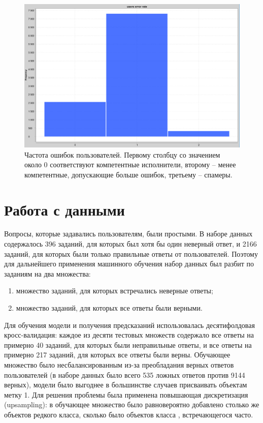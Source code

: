 \documentclass[specification,annotation,times]{itmo-student-thesis}
\begin{document}
\begin{figure}
  \includegraphics[scale=0.5]{users_error_rate.PNG}
  \caption{Частота ошибок пользователей. Первому столбцу со значением около 0 соответствуют компетентные исполнители, второму -- менее компетентные, допускающие больше ошибок, третьему -- спамеры.}
  \label{fig:users_error_rate}
\end{figure}

\section{Работа с данными}
Вопросы, которые задавались пользователям, были простыми. В наборе данных содержалось 396 заданий, для которых был хотя бы один неверный ответ, и 2166 заданий, для которых были только правильные ответы от пользователей. Поэтому для дальнейшего применения машинного обучения набор данных был разбит по заданиям на два множества: 
\begin{enumerate}
    \item множество заданий, для которых встречались неверные ответы;
    \item множество заданий, для которых все ответы были верными.
\end{enumerate}

Для обучения модели и получения предсказаний использовалась десятифолдовая кросс-валидация: каждое из десяти тестовых множеств содержало все ответы на примерно 40 заданий, для которых были неправильные ответы, и все ответы на примерно 217 заданий, для которых все ответы были верны. Обучающее множество было несбалансированным из-за преобладания верных ответов пользователей (в наборе данных было всего 535 ложных ответов против 9144 верных), модели было выгоднее в большинстве случаев присваивать объектам метку 1. Для решения проблемы была применена повышающая дискретизация (upsampling): в обучающее множество было равновероятно добавлено столько же объектов редкого класса, сколько было объектов класса , встречающегося часто.
\end{document}
